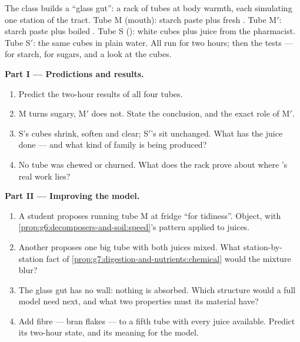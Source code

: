 \begin{problem}\label{pb:g7:digestion-and-nutrients:1}
The class builds a ``glass gut'': a rack of tubes at body
warmth, each simulating one station of the tract. Tube M
(mouth): starch paste plus fresh . Tube M$'$:
starch paste plus boiled . Tube S (): 
white cubes plus  juice from the pharmacist. Tube
S$'$: the same cubes in plain water. All run for two
hours; then the tests --- for starch, for sugars, and a
look at the cubes.

\medskip\noindent\textbf{Part I --- Predictions and
results.}
\begin{enumerate}
  \item Predict the two-hour results of all four tubes.
  \item M turns sugary, M$'$ does not. State the
        conclusion, and the exact role of M$'$.
  \item S's cubes shrink, soften and clear; S$'$'s sit
        unchanged. What has the  juice done ---
        and what kind of  family is being
        produced?
  \item No tube was chewed or churned. What does the
        rack prove about where 's real work
        lies?
\end{enumerate}

\medskip\noindent\textbf{Part II --- Improving the model.}
\begin{enumerate}[resume]
  \item A student proposes running tube M at fridge
         ``for tidiness''. Object, with
        \cref{prop:g6:decomposers-and-soil:speed}'s
        pattern applied to juices.
  \item Another proposes one big tube with both juices
        mixed. What station-by-station fact of
        \cref{prop:g7:digestion-and-nutrients:chemical}
        would the mixture blur?
  \item The glass gut has no wall: nothing is absorbed.
        Which structure would a full model need next,
        and what two properties must its material have?
  \item Add fibre --- bran flakes --- to a fifth tube
        with every juice available. Predict its two-hour
        state, and its meaning for the model.
\end{enumerate}


\end{problem}

